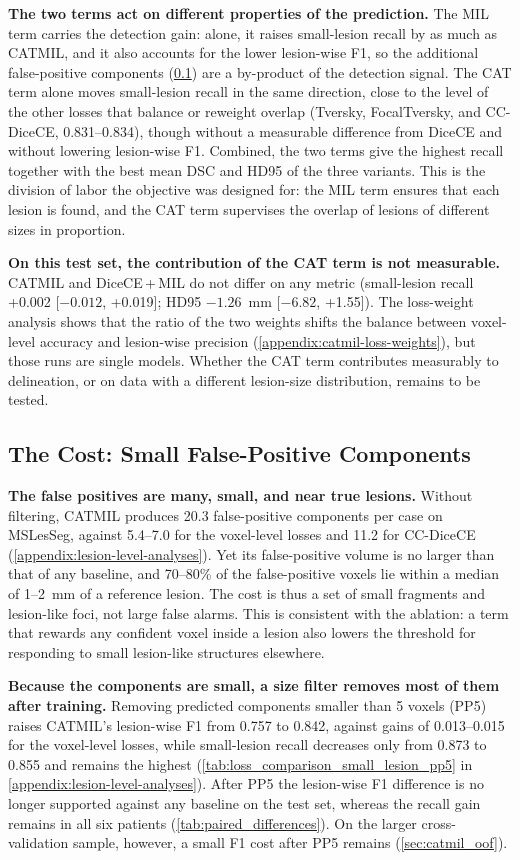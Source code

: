 \textbf{The two terms act on different properties of the prediction.} The
MIL term carries the detection gain: alone, it raises small-lesion recall
by as much as CATMIL, and it also accounts for the lower lesion-wise F1, so
the additional false-positive components (\cref{sec:fp_pp}) are a
by-product of the detection signal. The CAT term alone moves small-lesion
recall in the same direction, close to the level of the other losses that
balance or reweight overlap (Tversky, FocalTversky, and CC-DiceCE,
0.831--0.834), though without a measurable difference from DiceCE and without
lowering lesion-wise F1. Combined, the two terms give the highest recall
together with the best mean DSC and HD95 of the three variants. This is
the division of labor the objective was designed for: the MIL term ensures
that each lesion is found, and the CAT term supervises the overlap of
lesions of different sizes in proportion.

\textbf{On this test set, the contribution of the CAT term is not
measurable.} CATMIL and DiceCE\,+\,MIL do not differ on any metric
(small-lesion recall +0.002 [$-0.012$, +0.019]; HD95 $-1.26$~mm
[$-6.82$, +1.55]). The loss-weight analysis shows that the ratio of the
two weights shifts the balance between voxel-level accuracy and
lesion-wise precision (\cref{appendix:catmil-loss-weights}), but those
runs are single models. Whether the CAT term contributes measurably to
delineation, or on data with a different lesion-size distribution, remains
to be tested.

\subsection{The Cost: Small False-Positive Components}
\label{sec:fp_pp}

\textbf{The false positives are many, small, and near true lesions.}
Without filtering, CATMIL produces 20.3 false-positive components per case
on MSLesSeg, against 5.4--7.0 for the voxel-level losses and 11.2 for
CC-DiceCE (\cref{appendix:lesion-level-analyses}). Yet its false-positive
volume is no larger than that of any baseline, and 70--80\% of the
false-positive voxels lie within a median of 1--2~mm of a reference lesion.
The cost is thus a set of small fragments and lesion-like foci, not large
false alarms. This is consistent with the ablation: a term that rewards
any confident voxel inside a lesion also lowers the threshold for
responding to small lesion-like structures elsewhere.

\textbf{Because the components are small, a size filter removes most of
them after training.} Removing predicted components smaller than 5 voxels
(PP5) raises CATMIL's lesion-wise F1 from 0.757 to 0.842, against gains of
0.013--0.015 for the voxel-level losses, while small-lesion recall
decreases only from 0.873 to 0.855 and remains the highest
(\cref{tab:loss_comparison_small_lesion_pp5} in
\cref{appendix:lesion-level-analyses}). After PP5 the lesion-wise F1
difference is no longer supported against any baseline on the test set,
whereas the recall gain remains in all six patients
(\cref{tab:paired_differences}). On the larger cross-validation sample,
however, a small F1 cost after PP5 remains (\cref{sec:catmil_oof}).

